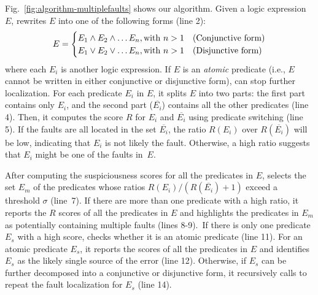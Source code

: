 Fig.~\ref{fig:algorithm-multiplefaults} shows our algorithm.
Given a logic expression $E$,
\tool{} rewrites $E$ into one of the following forms (line 2):\\
\[
\small
E =
\begin{cases}
    E_1 \wedge E_2 \wedge \ldots E_n, \text{with } n > 1 & \text{(Conjunctive form)} \\
    E_1 \vee E_2 \vee \ldots E_n, \text{with } n > 1 & \text{(Disjunctive form)} \\
\end{cases}
\]
where each $E_i$ is another logic expression. If $E$ is an
\emph{atomic} predicate (i.e., $E$ cannot be written in either
conjunctive or disjunctive form), {\tool} can stop further
localization. For each predicate $E_i$ in $E$, it splits $E$ into two
parts: the first part contains only $E_i$, and the second part
($\overline{E_i}$) contains all the other predicates (line 4). Then,
it computes the score $R$ for $E_i$ and
$\overline{E_i}$ using predicate switching (line 5). If
the faults are all located in the set $\overline{E_i}$, the ratio
$R(E_i)$ over $R(\overline{E_i})$ will be low, indicating that $E_i$
is not likely the fault. Otherwise, a high ratio suggests that $E_i$
might be one of the faults in~$E$.



After computing the suspiciousness scores for all the predicates in
$E$, \tool{} selects the set $E_m$ of the predicates whose ratios
$R(E_i) / (R(\overline{E_i}) + 1)$ exceed a threshold $\sigma$
(line~7). If there are more than one predicate with a high ratio, it
reports the $R$ scores of all the predicates in $E$ and highlights the
predicates in $E_m$ as potentially containing multiple faults (lines
8-9).~If there is only one predicate $E_s$ with a high score, {\tool}
checks whether it is an atomic predicate (line 11). For an
atomic predicate $E_s$, it reports the scores of all the predicates in
$E$ and identifies $E_s$ as the likely single source of the error
(line 12). Otherwise, if $E_s$ can be further decomposed into a
conjunctive or disjunctive form, it recursively calls
 to repeat the fault localization for
$E_s$ (line 14).

